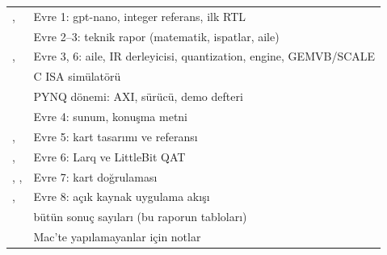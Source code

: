 \begin{center}\small
{}\label{tab:harita}
\begin{tabularx}{\textwidth}{@{}>{\raggedright\arraybackslash}p{5.6cm}L@{}}
\toprule
{} &  \\
\midrule
{},  & Evre 1: gpt-nano, integer referans, ilk RTL \\
 & Evre 2–3: teknik rapor (matematik, ispatlar, aile) \\
,  & Evre 3, 6: aile, IR derleyicisi, quantization, engine, GEMVB/SCALE \\
 & C ISA simülatörü \\
 & PYNQ dönemi: AXI, sürücü, demo defteri \\
 & Evre 4: sunum, konuşma metni \\
,  & Evre 5: kart tasarımı ve referansı \\
,  & Evre 6: Larq ve LittleBit QAT \\
, ,  & Evre 7: kart doğrulaması \\
,  & Evre 8: açık kaynak uygulama akışı \\
 & bütün sonuç sayıları (bu raporun tabloları) \\
 & Mac'te yapılamayanlar için notlar \\
\bottomrule
\end{tabularx}
\end{center}
